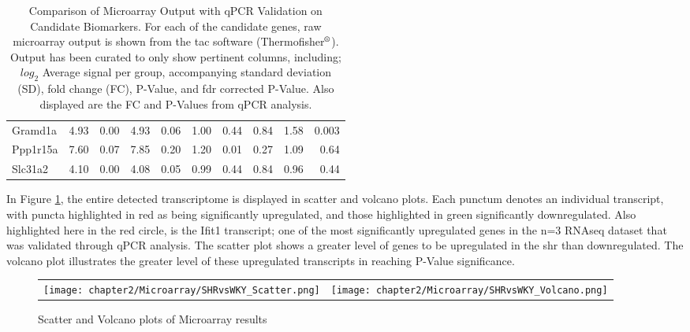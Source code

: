 \begin{sidewaystable}[!htbp]
\begin{tabular}{lrrrrrrr|rr}
Gramd1a              & 4.93                    & 0.00            & 4.93                    & 0.06            & 1.00                 & 0.44           & 0.84                & 1.58  & 0.003\\
Ppp1r15a             & 7.60                    & 0.07            & 7.85                    & 0.20            & 1.20                 & 0.01           & 0.27                & 1.09  & 0.64\\
Slc31a2              & 4.10                    & 0.00            & 4.08                    & 0.05            & 0.99                 & 0.44           & 0.84                & 0.96  & 0.44
\end{tabular}
\caption[Comparison of Microarray Output with qPCR Validation on Candidate Biomarkers]{Comparison of Microarray Output with qPCR Validation on Candidate Biomarkers. For each of the candidate genes, raw microarray output is shown from the \acrfull{tac} software (Thermofisher$\textsuperscript{\textregistered}$). Output has been curated to only show pertinent columns, including; $log_{2}$ Average signal per group, accompanying standard deviation (SD), fold change (FC), P-Value, and \acrshort{fdr} corrected P-Value. Also displayed are the FC and P-Values from qPCR analysis.}
\label{tab:Microcandidates}
\end{sidewaystable}

In Figure \ref{fig:microarrayvolcano}, the entire detected transcriptome is displayed in scatter and volcano plots. Each punctum denotes an individual transcript, with puncta highlighted in red as being significantly upregulated, and those highlighted in green significantly downregulated. Also highlighted here in the red circle, is the Ifit1 transcript; one of the most significantly upregulated genes in the n=3 RNAseq dataset that was validated through qPCR analysis. The scatter plot shows a greater level of genes to be upregulated in the \acrshort{shr} than downregulated. The volcano plot illustrates the greater level of these upregulated transcripts in reaching P-Value significance. \\

\begin{figure}[!htbp]
  \centering 
  \begin{tabular}{cc}
  \texttt{[image: chapter2/Microarray/SHRvsWKY\_Scatter.png]} & \texttt{[image: chapter2/Microarray/SHRvsWKY\_Volcano.png]}\\
\end{tabular} 
  \caption{Scatter and Volcano plots of Microarray results}
  \label{fig:microarrayvolcano}
\end{figure}

